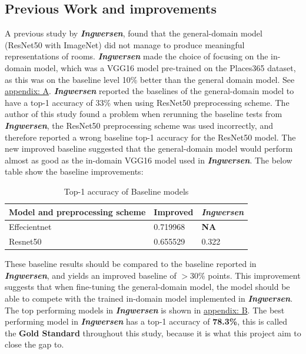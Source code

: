 \subsection{Previous Work and improvements}\label{Improvement}
A previous study by \textbf{\textit{Ingwersen}}\autocite{Ingwersen}, found that the general-domain model (ResNet50 with ImageNet) did not manage to produce meaningful representations of rooms. \textbf{\textit{Ingwersen}} made the choice of focusing on the in-domain model, which was a VGG16 model pre-trained on the Places365 dataset, as this was on the baseline level 10\% better than the general domain model. See \hyperref[appendix: A]{appendix: A}. \textbf{\textit{Ingwersen}} reported the baselines of the general-domain model to have a top-1 accuracy of 33\% when using ResNet50 preprocessing scheme. The author of this study found a problem when rerunning the baseline tests from \textbf{\textit{Ingwersen}}, the ResNet50 preprocessing scheme was used incorrectly, and therefore reported a wrong baseline top-1 accuracy for the ResNet50 model. The new improved baseline suggested that the general-domain model would perform almost as good as the in-domain VGG16 model used in \textbf{\textit{Ingwersen}}. The below table show the baseline improvements:
\begin{table}[H]
\centering
\begin{tabular}{lll}
Model and preprocessing scheme     & Improved                      & \textit{\textbf{Ingwersen}}      \\ \hline
\multicolumn{1}{|l|}{Effecientnet} & \multicolumn{1}{l|}{0.719968} & \multicolumn{1}{l|}{\textbf{NA}} \\ \hline
\multicolumn{1}{|l|}{Resnet50}     & \multicolumn{1}{l|}{0.655529} & \multicolumn{1}{l|}{0.322}       \\ \hline
\end{tabular}
\caption{Top-1 accuracy of Baseline models}
\end{table}
These baseline results should be compared to the baseline reported in \textbf{\textit{Ingwersen}}, and yields an improved baseline of $>$30\% points. This improvement suggests that when fine-tuning the general-domain model, the model should be able to compete with the trained in-domain model implemented in \textbf{\textit{Ingwersen}}. The top performing models in \textbf{\textit{Ingwersen}} is shown in \hyperref[appendix: B]{appendix: B}. The best performing model in \textbf{\textit{Ingwersen}} has a top-1 accuracy of \textbf{78.3\%}, this is called the \textbf{Gold Standard}\label{goldstandard} throughout this study, because it is what this project aim to close the gap to.

